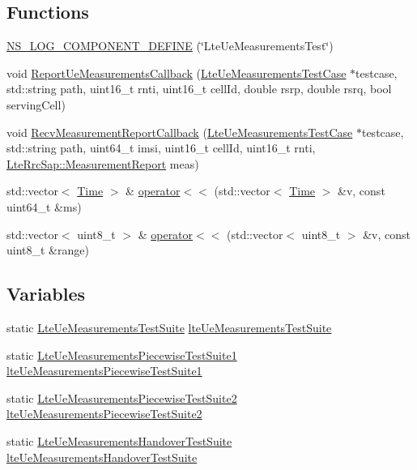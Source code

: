 \subsection*{Functions}
\begin{DoxyCompactItemize}
\item 
\hyperlink{lte-test-ue-measurements_8cc_a4583aa964900f87f187a4cb0834bf4b6}{N\+S\+\_\+\+L\+O\+G\+\_\+\+C\+O\+M\+P\+O\+N\+E\+N\+T\+\_\+\+D\+E\+F\+I\+NE} (\char`\"{}Lte\+Ue\+Measurements\+Test\char`\"{})
\item 
void \hyperlink{lte-test-ue-measurements_8cc_a47cd94bfad5174d824825900b4dc62c9}{Report\+Ue\+Measurements\+Callback} (\hyperlink{classLteUeMeasurementsTestCase}{Lte\+Ue\+Measurements\+Test\+Case} $\ast$testcase, std\+::string path, uint16\+\_\+t rnti, uint16\+\_\+t cell\+Id, double rsrp, double rsrq, bool serving\+Cell)
\item 
void \hyperlink{lte-test-ue-measurements_8cc_aef7d01f73ec41364e58842fcbcc4adad}{Recv\+Measurement\+Report\+Callback} (\hyperlink{classLteUeMeasurementsTestCase}{Lte\+Ue\+Measurements\+Test\+Case} $\ast$testcase, std\+::string path, uint64\+\_\+t imsi, uint16\+\_\+t cell\+Id, uint16\+\_\+t rnti, \hyperlink{structns3_1_1LteRrcSap_1_1MeasurementReport}{Lte\+Rrc\+Sap\+::\+Measurement\+Report} meas)
\item 
std\+::vector$<$ \hyperlink{classns3_1_1Time}{Time} $>$ \& \hyperlink{lte-test-ue-measurements_8cc_a8bebd9a677a89e21b2a84c7a894faa69}{operator$<$$<$} (std\+::vector$<$ \hyperlink{classns3_1_1Time}{Time} $>$ \&v, const uint64\+\_\+t \&ms)
\item 
std\+::vector$<$ uint8\+\_\+t $>$ \& \hyperlink{lte-test-ue-measurements_8cc_aaf8438b1499fb87e63de468d21dd09a1}{operator$<$$<$} (std\+::vector$<$ uint8\+\_\+t $>$ \&v, const uint8\+\_\+t \&range)
\end{DoxyCompactItemize}
\subsection*{Variables}
\begin{DoxyCompactItemize}
\item 
static \hyperlink{classLteUeMeasurementsTestSuite}{Lte\+Ue\+Measurements\+Test\+Suite} \hyperlink{lte-test-ue-measurements_8cc_acaaaeab69f59157f8c7b2e4a241f8a1c}{lte\+Ue\+Measurements\+Test\+Suite}
\item 
static \hyperlink{classLteUeMeasurementsPiecewiseTestSuite1}{Lte\+Ue\+Measurements\+Piecewise\+Test\+Suite1} \hyperlink{lte-test-ue-measurements_8cc_ae3a1171867ae551943c7ed4258617f19}{lte\+Ue\+Measurements\+Piecewise\+Test\+Suite1}
\item 
static \hyperlink{classLteUeMeasurementsPiecewiseTestSuite2}{Lte\+Ue\+Measurements\+Piecewise\+Test\+Suite2} \hyperlink{lte-test-ue-measurements_8cc_a20835381877e3f889f24d346537e81fe}{lte\+Ue\+Measurements\+Piecewise\+Test\+Suite2}
\item 
static \hyperlink{classLteUeMeasurementsHandoverTestSuite}{Lte\+Ue\+Measurements\+Handover\+Test\+Suite} \hyperlink{lte-test-ue-measurements_8cc_a5d4d6170730e48108f294303834b4ac5}{lte\+Ue\+Measurements\+Handover\+Test\+Suite}
\end{DoxyCompactItemize}


